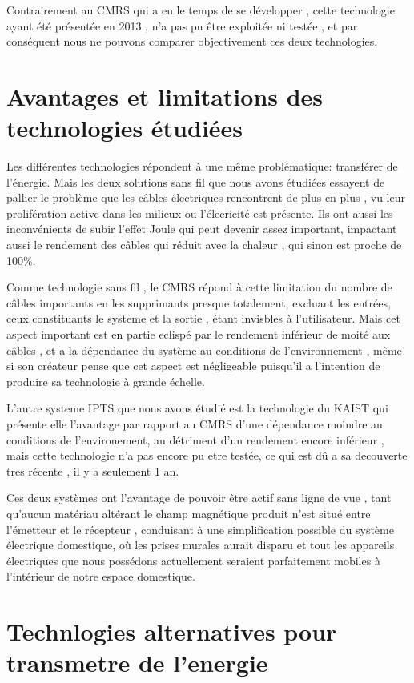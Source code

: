 \documentclass[12pt]{report}
\begin{document}
  Contrairement au CMRS qui a eu le temps de se développer , cette technologie ayant été présentée en 2013 , n'a pas pu être exploitée ni testée , et par conséquent nous ne pouvons comparer objectivement ces deux technologies.
\section{Avantages et limitations des technologies étudiées}
Les différentes technologies répondent à une même problématique: transférer de l'énergie. Mais les deux solutions sans fil que nous avons étudiées essayent de pallier le problème que les câbles électriques rencontrent de plus en plus , vu leur prolifération active dans les milieux ou l'élecricité est présente. Ils ont aussi les inconvénients de subir l'effet Joule qui peut devenir assez important, impactant aussi le rendement des câbles qui réduit avec la chaleur , qui sinon est proche de 100\%.

  Comme technologie sans fil , le CMRS répond à cette limitation du nombre de câbles importants en les supprimants presque totalement, excluant les entrées, ceux constituants le systeme et la sortie , étant invisbles à l'utilisateur. Mais cet aspect important est en partie eclispé par le rendement inférieur de moité aux câbles , et a la dépendance du système au conditions de l'environnement , même si son créateur pense que cet aspect est négligeable puisqu'il a l'intention de produire sa technologie à grande échelle.
  
  L'autre systeme IPTS que nous avons étudié est la technologie du KAIST qui présente elle l'avantage par rapport au CMRS d'une dépendance moindre au conditions de l'environement, au détriment d'un rendement encore inférieur , mais cette technologie n'a pas encore pu etre testée, ce qui est dû a sa decouverte tres récente , il y a seulement 1 an.
  
  Ces deux systèmes ont l'avantage de pouvoir être actif sans ligne de vue , tant qu'aucun matériau altérant le champ magnétique produit n'est situé entre l'émetteur et le récepteur , conduisant à une simplification possible du système électrique domestique, où les prises murales aurait disparu et tout les appareils électriques que nous possédons actuellement seraient parfaitement mobiles à l'intérieur de notre espace domestique.
\section{Technlogies alternatives pour transmetre de l'energie \cite{wiki5}}
\end{document}
